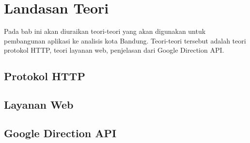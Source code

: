 \chapter{Landasan Teori}
\label{chap:teori}

Pada bab ini akan diuraikan teori-teori yang akan digunakan untuk pembangunan aplikasi ke analisis kota Bandung. Teori-teori tersebut adalah teori protokol HTTP, teori layanan web, penjelasan dari Google Direction API.

\section{Protokol HTTP}
\label{sec:prothttp} 



\section{Layanan Web}
\label{sec:webservice}


\section{Google Direction API}
\label{sec:template}
 
 